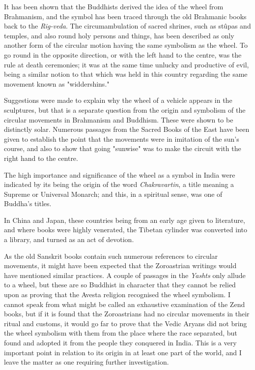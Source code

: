\documentclass[a4paper, 11pt, oneside, polutonikogreek, english]{article}
\begin{document}
It has been shown that the Buddhists derived the idea of the wheel from Brahmanism, and the symbol has been traced through the old Brahmanic books back to the \emph{Rig-veda}. The circumambulation of sacred shrines, such as stûpas and temples, and also round holy persons and things, has been described as only another form of the circular motion having the same symbolism as the wheel. To go round in the opposite direction, or with the left hand to the centre, was the rule at death ceremonies; it was at the same time unlucky and productive of evil, being a similar notion to that which was held in this country regarding the same movement known as "widdershins."

Suggestions were made to explain why the wheel of a vehicle appears in the sculptures, but that is a separate question from the origin and symbolism of the circular movements in Brahmanism and Buddhism. These were shown to be distinctly solar. Numerous passages from the Sacred Books of the East have been given to establish the point that the movements were in imitation of the sun's course, and also to show that going "sunwise" was to make the circuit with the right hand to the centre.

The high importance and significance of the wheel as a symbol in India were indicated by its being the origin of the word \emph{Chakravartin}, a title meaning a Supreme or Universal Monarch; and this, in a spiritual sense, was one of Buddha's titles.

In China and Japan, these countries being from an early age given to literature, and where books were highly venerated, the Tibetan cylinder was converted into a library, and turned as an act of devotion.

As the old Sanskrit books contain such numerous references to circular movements, it might have been expected that the Zoroastrian writings would have mentioned similar practices. A couple of passages in the \emph{Yashts} only allude to a wheel, but these are so Buddhist in character that they cannot be relied upon as proving that the Avesta religion recognised the wheel symbolism. I cannot speak from what might be called an exhaustive examination of the Zend books, but if it is found that the Zoroastrians had no circular movements in their ritual and customs, it would go far to prove that the Vedic Aryans did not bring the wheel symbolism with them from the place where the race separated, but found and adopted it from the people they conquered in India. This is a very important point in relation to its origin in at least one part of the world, and I leave the matter as one requiring further investigation.
\end{document}

